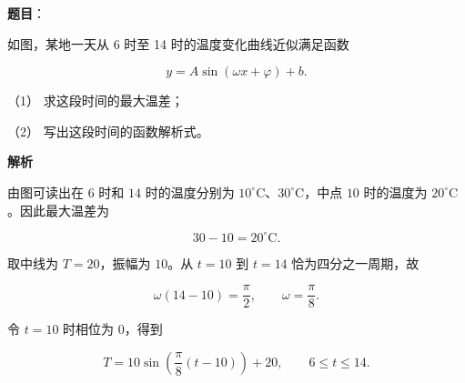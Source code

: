 \begin{answer}

\textbf{题目}：

如图，某地一天从 6 时至 14 时的温度变化曲线近似满足函数

\nopagebreak[4]
\[
y=A\sin(\omega x+\varphi)+b.
\]
\nopagebreak[4]
\begin{center}\end{center}
\nopagebreak[4]
（1） 求这段时间的最大温差；

（2） 写出这段时间的函数解析式。

\textbf{解析}


由图可读出在 $6$ 时和 $14$ 时的温度分别为 $10^\circ\mathrm C$、$30^\circ\mathrm C$，中点 $10$ 时的温度为 $20^\circ\mathrm C$。因此最大温差为

\nopagebreak[4]
\[
30-10=20^\circ\mathrm C.
\]

取中线为 $T=20$，振幅为 $10$。从 $t=10$ 到 $t=14$ 恰为四分之一周期，故

\nopagebreak[4]
\[
\omega(14-10)=\frac\pi2,\qquad \omega=\frac\pi8.
\]


令 $t=10$ 时相位为 $0$，得到

\nopagebreak[4]
\[
T=10\sin\left(\frac\pi8(t-10)\right)+20,
\qquad 6\leqslant t\leqslant14.
\]



\end{answer}
